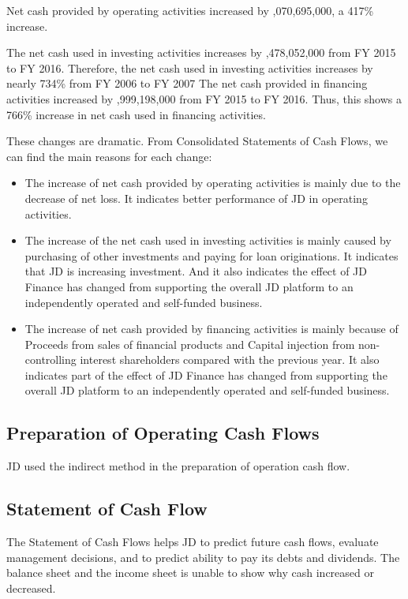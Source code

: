 Net cash provided by operating activities increased by ,070,695,000, a 417\% increase.  

The net cash used in investing activities increases by ,478,052,000 from FY 2015 to FY 2016. Therefore, the net cash used in investing activities increases by nearly 734\% from FY 2006 to FY 2007
The net cash provided in financing activities increased by ,999,198,000 from FY 2015 to FY 2016. Thus, this shows a 766\% increase in net cash used in financing activities.

These changes are dramatic. From Consolidated Statements of Cash Flows, we can find the main reasons for each change:
\begin{itemize}
\item The increase of net cash provided by operating activities is mainly due to the decrease of net loss. It indicates better performance of JD in operating activities.
	


\item The increase of the net cash used in investing activities is mainly caused by purchasing of other investments and paying for loan originations. It indicates that JD is increasing investment. And it also indicates the effect of JD Finance has changed from supporting the overall JD platform to an independently operated and self-funded business.

\item The increase of net cash provided by financing activities is mainly because of Proceeds from sales of financial products and Capital injection from non-controlling interest shareholders compared with the previous year. It also indicates part of the effect of JD Finance has changed from supporting the overall JD platform to an independently operated and self-funded business.

\end{itemize}


\subsection{Preparation of Operating Cash Flows}
JD used the indirect method in the preparation of operation cash flow.

\subsection{Statement of Cash Flow}
The Statement of Cash Flows helps JD to predict future cash flows, evaluate management decisions, and to predict ability to pay its debts and dividends. The balance sheet and the income sheet is unable to show why cash increased or decreased.   


